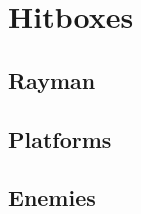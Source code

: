 \chapter{Hitboxes}
\label{cha:hitboxes}

\section{Rayman}
\label{sec:hitbox-rayman}


\section{Platforms}
\label{sec:hitbox-platforms}


\section{Enemies}
\label{sec:hitbox-enemies}

